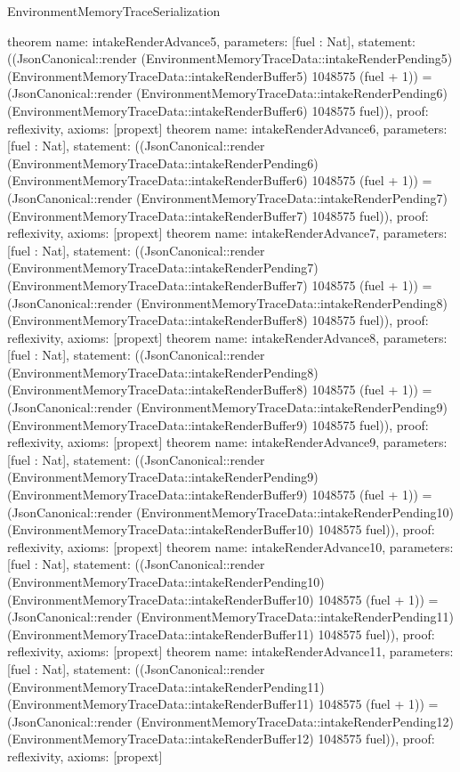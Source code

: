 \begin{lexlean}{EnvironmentMemoryTraceSerialization}
\begin{semanticmodule}
{}
theorem{
 name: intakeRenderAdvance5, parameters: [fuel : Nat],
 statement: ((JsonCanonical::render (EnvironmentMemoryTraceData::intakeRenderPending5) (EnvironmentMemoryTraceData::intakeRenderBuffer5) 1048575 (fuel + 1)) = (JsonCanonical::render (EnvironmentMemoryTraceData::intakeRenderPending6) (EnvironmentMemoryTraceData::intakeRenderBuffer6) 1048575 fuel)), proof: reflexivity{}, axioms: [propext]
}
theorem{
 name: intakeRenderAdvance6, parameters: [fuel : Nat],
 statement: ((JsonCanonical::render (EnvironmentMemoryTraceData::intakeRenderPending6) (EnvironmentMemoryTraceData::intakeRenderBuffer6) 1048575 (fuel + 1)) = (JsonCanonical::render (EnvironmentMemoryTraceData::intakeRenderPending7) (EnvironmentMemoryTraceData::intakeRenderBuffer7) 1048575 fuel)), proof: reflexivity{}, axioms: [propext]
}
theorem{
 name: intakeRenderAdvance7, parameters: [fuel : Nat],
 statement: ((JsonCanonical::render (EnvironmentMemoryTraceData::intakeRenderPending7) (EnvironmentMemoryTraceData::intakeRenderBuffer7) 1048575 (fuel + 1)) = (JsonCanonical::render (EnvironmentMemoryTraceData::intakeRenderPending8) (EnvironmentMemoryTraceData::intakeRenderBuffer8) 1048575 fuel)), proof: reflexivity{}, axioms: [propext]
}
theorem{
 name: intakeRenderAdvance8, parameters: [fuel : Nat],
 statement: ((JsonCanonical::render (EnvironmentMemoryTraceData::intakeRenderPending8) (EnvironmentMemoryTraceData::intakeRenderBuffer8) 1048575 (fuel + 1)) = (JsonCanonical::render (EnvironmentMemoryTraceData::intakeRenderPending9) (EnvironmentMemoryTraceData::intakeRenderBuffer9) 1048575 fuel)), proof: reflexivity{}, axioms: [propext]
}
theorem{
 name: intakeRenderAdvance9, parameters: [fuel : Nat],
 statement: ((JsonCanonical::render (EnvironmentMemoryTraceData::intakeRenderPending9) (EnvironmentMemoryTraceData::intakeRenderBuffer9) 1048575 (fuel + 1)) = (JsonCanonical::render (EnvironmentMemoryTraceData::intakeRenderPending10) (EnvironmentMemoryTraceData::intakeRenderBuffer10) 1048575 fuel)), proof: reflexivity{}, axioms: [propext]
}
theorem{
 name: intakeRenderAdvance10, parameters: [fuel : Nat],
 statement: ((JsonCanonical::render (EnvironmentMemoryTraceData::intakeRenderPending10) (EnvironmentMemoryTraceData::intakeRenderBuffer10) 1048575 (fuel + 1)) = (JsonCanonical::render (EnvironmentMemoryTraceData::intakeRenderPending11) (EnvironmentMemoryTraceData::intakeRenderBuffer11) 1048575 fuel)), proof: reflexivity{}, axioms: [propext]
}
theorem{
 name: intakeRenderAdvance11, parameters: [fuel : Nat],
 statement: ((JsonCanonical::render (EnvironmentMemoryTraceData::intakeRenderPending11) (EnvironmentMemoryTraceData::intakeRenderBuffer11) 1048575 (fuel + 1)) = (JsonCanonical::render (EnvironmentMemoryTraceData::intakeRenderPending12) (EnvironmentMemoryTraceData::intakeRenderBuffer12) 1048575 fuel)), proof: reflexivity{}, axioms: [propext]
}
\end{semanticmodule}
\end{lexlean}
